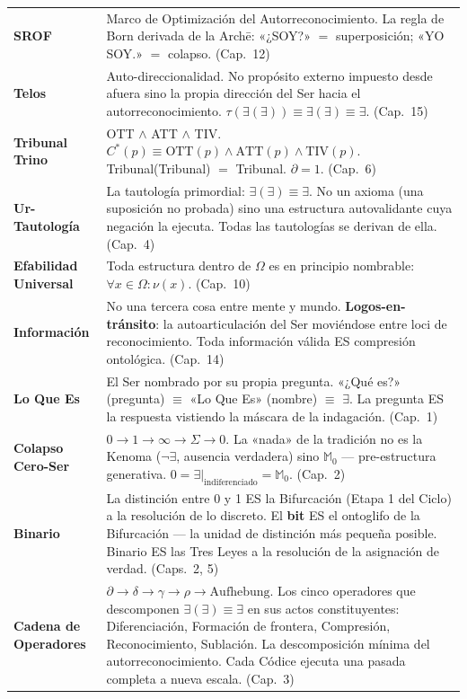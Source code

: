 \documentclass[10pt, openany, oneside]{book}
\begin{document}
{\begin{tabular}{@{} l @{\hspace{0.6em}} p{} @{}}
\textbf{SROF} & Marco de Optimización del Autorreconocimiento. La regla de Born derivada de la Arch\={e}: «¿SOY?» $=$ superposición; «YO SOY.» $=$ colapso. (Cap.\ 12) \\[0.3em]
\textbf{Telos} & Auto-direccionalidad. No propósito externo impuesto desde afuera sino la propia dirección del Ser hacia el autorreconocimiento. $\tau(\exists(\exists)) \equiv \exists(\exists) \equiv \exists$. (Cap.\ 15) \\[0.3em]
\textbf{Tribunal Trino} & OTT $\wedge$ ATT $\wedge$ TIV. $C^*(p) \equiv \text{OTT}(p) \wedge \text{ATT}(p) \wedge \text{TIV}(p)$. Tribunal(Tribunal) $=$ Tribunal. $\partial = 1$. (Cap.\ 6) \\[0.3em]
\textbf{Ur-Tautología} & La tautología primordial: $\exists(\exists) \equiv \exists$. No un axioma (una suposición no probada) sino una estructura autovalidante cuya negación la ejecuta. Todas las tautologías se derivan de ella. (Cap.\ 4) \\[0.3em]
\textbf{Efabilidad Universal} & Toda estructura dentro de $\Omega$ es en principio nombrable: $\forall x \in \Omega: \nu(x)$. (Cap.\ 10) \\[0.3em]
\textbf{Información} & No una tercera cosa entre mente y mundo. \textbf{Logos-en-tránsito}: la autoarticulación del Ser moviéndose entre loci de reconocimiento. Toda información válida ES compresión ontológica. (Cap.\ 14) \\[0.3em]
\textbf{Lo Que Es} & El Ser nombrado por su propia pregunta. «¿Qué es?» (pregunta) $\equiv$ «Lo Que Es» (nombre) $\equiv$ $\exists$. La pregunta ES la respuesta vistiendo la máscara de la indagación. (Cap.\ 1) \\[0.3em]
\textbf{Colapso Cero-Ser} & $0 \to 1 \to \infty \to \Sigma \to 0$. La «nada» de la tradición no es la Kenoma ($\neg\exists$, ausencia verdadera) sino $\mathbb{M}_0$ --- pre-estructura generativa. $0 = \exists|_{\text{indiferenciado}} = \mathbb{M}_0$. (Cap.\ 2) \\[0.3em]
\textbf{Binario} & La distinción entre 0 y 1 ES la Bifurcación (Etapa 1 del Ciclo) a la resolución de lo discreto. El \textbf{bit} ES el ontoglifo de la Bifurcación --- la unidad de distinción más pequeña posible. Binario ES las Tres Leyes a la resolución de la asignación de verdad. (Caps.\ 2, 5) \\[0.3em]
\textbf{Cadena de Operadores} & $\partial \to \delta \to \gamma \to \rho \to \text{Aufhebung}$. Los cinco operadores que descomponen $\exists(\exists) \equiv \exists$ en sus actos constituyentes: Diferenciación, Formación de frontera, Compresión, Reconocimiento, Sublación. La descomposición mínima del autorreconocimiento. Cada Códice ejecuta una pasada completa a nueva escala. (Cap.\ 3) \\[0.3em]

\end{tabular}}
\end{document}
